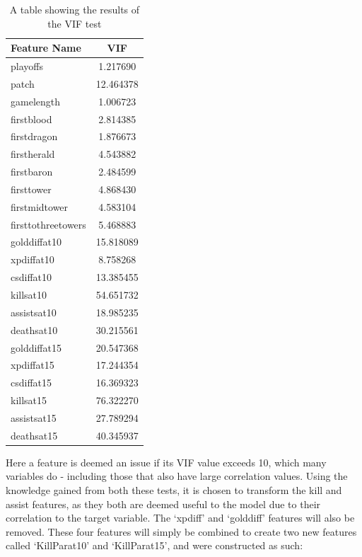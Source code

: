 \begin{table}[h]
    \centering
    \caption{A table showing the results of the VIF test}
    \begin{tabular}{l c}
        \toprule
        \textbf{Feature Name} & \textbf{VIF} \\
        \midrule
            playoffs &	1.217690 \\
            patch &	12.464378 \\
            gamelength &	1.006723 \\
            firstblood &	2.814385 \\
            firstdragon &	1.876673 \\
            firstherald &	4.543882 \\
            firstbaron &	2.484599 \\
            firsttower &	4.868430 \\
            firstmidtower &	4.583104 \\
            firsttothreetowers &	5.468883 \\
            golddiffat10 &	15.818089 \\
            xpdiffat10 &	8.758268 \\
            csdiffat10 &	13.385455 \\
            killsat10 &	54.651732 \\
            assistsat10 &	18.985235 \\
            deathsat10 &	30.215561 \\
            golddiffat15 &	20.547368 \\
            xpdiffat15 &	17.244354 \\
            csdiffat15 &	16.369323 \\
            killsat15 &	76.322270 \\
            assistsat15 &	27.789294 \\
            deathsat15 &	40.345937 \\
        \bottomrule
    \end{tabular}
    \label{tab:VIF}
\end{table}

Here a feature is deemed an issue if its VIF value exceeds 10, which many variables do - including those that also have large correlation values.
Using the knowledge gained from both these tests, it is chosen to transform the kill and assist features, as they both are deemed useful to the model due to their correlation to the target variable.
The `xpdiff' and `golddiff' features will also be removed.
These four features will simply be combined to create two new features called `KillParat10' and `KillParat15', and were constructed as such:


